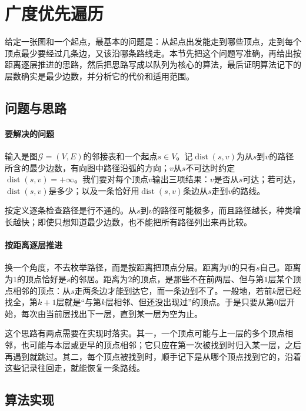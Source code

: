 \section{广度优先遍历}
\label{sec:graph-bfs}

给定一张图和一个起点，最基本的问题是：从起点出发能走到哪些顶点，走到每个顶点最少要经过几条边，又该沿哪条路线走。本节先把这个问题写准确，再给出按距离逐层推进的思路，然后把思路写成以队列为核心的算法，最后证明算法记下的层数确实是最少边数，并分析它的代价和适用范围。

\subsection{问题与思路}
\label{sec:graph-trav-bfs-problem}

\paragraph{要解决的问题}
输入是图$\mathcal G=(V,E)$的邻接表和一个起点$s\in V$。记$\operatorname{dist}(s,v)$为从$s$到$v$的路径所含的最少边数，有向图中路径沿弧的方向；$v$从$s$不可达时约定$\operatorname{dist}(s,v)=+\infty$。我们要对每个顶点$v$输出三项结果：$v$是否从$s$可达；若可达，$\operatorname{dist}(s,v)$是多少；以及一条恰好用$\operatorname{dist}(s,v)$条边从$s$走到$v$的路线。

按定义逐条检查路径是行不通的。从$s$到$v$的路径可能极多，而且路径越长，种类增长越快；即使只想知道最少边数，也不能把所有路径列出来再比较。

\paragraph{按距离逐层推进}
换一个角度，不去枚举路径，而是按距离把顶点分层。距离为$0$的只有$s$自己。距离为$1$的顶点恰好是$s$的邻居。距离为$2$的顶点，是那些不在前两层、但与第$1$层某个顶点相邻的顶点：从$s$走两条边才能到达它，而一条边到不了。一般地，若前$k$层已经找全，第$k+1$层就是“与第$k$层相邻、但还没出现过”的顶点。于是只要从第$0$层开始，每次由当前层找出下一层，直到某一层为空为止。

这个思路有两点需要在实现时落实。其一，一个顶点可能与上一层的多个顶点相邻，也可能与本层或更早的顶点相邻；它只应在第一次被找到时归入某一层，之后再遇到就跳过。其二，每个顶点被找到时，顺手记下是从哪个顶点找到它的，沿着这些记录往回走，就能恢复一条路线。

\subsection{算法实现}
\label{sec:graph-trav-bfs-algorithm}

